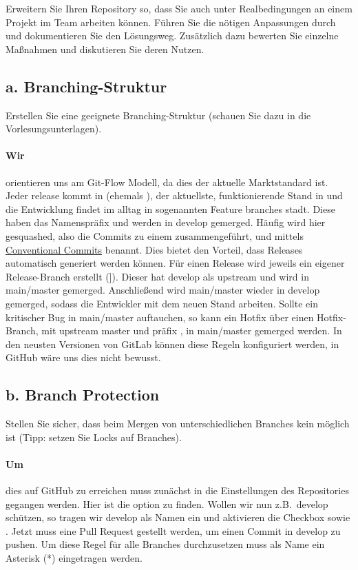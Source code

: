 Erweitern Sie Ihren Repository so, dass Sie auch unter Realbedingungen an einem Projekt im Team arbeiten können.
Führen Sie die nötigen Anpassungen durch und dokumentieren Sie den Lösungsweg.
Zusätzlich dazu bewerten Sie einzelne Maßnahmen und diskutieren Sie deren Nutzen.

\subsection{a. Branching-Struktur}\label{subsec:a.-branching-struktur}
Erstellen Sie eine geeignete Branching-Struktur (schauen Sie dazu in die Vorlesungsunterlagen).

\paragraph{Wir} orientieren uns am Git-Flow Modell, da dies der aktuelle Marktstandard ist.
Jeder release kommt in  (ehemals ), der aktuellste, funktionierende Stand in  und die Entwicklung findet im alltag in sogenannten Feature branches stadt.
Diese haben das Namenspräfix  und werden in develop gemerged.
Häufig wird hier gesquashed, also die Commits zu einem zusammengeführt, und mittels \href{https://www.conventionalcommits.org/en/v1.0.0/}{Conventional Commits} benannt.
Dies bietet den Vorteil, dass Releases automatisch generiert werden können.
Für einen Release wird jeweils ein eigener Release-Branch erstellt (]).
Dieser hat develop als upstream und wird in main/master gemerged.
Anschließend wird main/master wieder in develop gemerged, sodass die Entwickler mit dem neuen Stand arbeiten.
Sollte ein kritischer Bug in main/master auftauchen, so kann ein Hotfix über einen Hotfix-Branch, mit upstream master und präfix , in main/master gemerged werden.
In den neusten Versionen von GitLab können diese Regeln konfiguriert werden, in GitHub wäre uns dies nicht bewusst.

\subsection{b. Branch Protection}\label{subsec:b.-branch-protection}
Stellen Sie sicher, dass beim Mergen von unterschiedlichen Branches kein  möglich ist (Tipp: setzen Sie Locks auf Branches).

\paragraph{Um} dies auf GitHub zu erreichen muss zunächst in die Einstellungen des Repositories gegangen werden.
Hier ist die option  zu finden.
Wollen wir nun z.B.\ develop schützen, so tragen wir develop als Namen ein und aktivieren die Checkbox  sowie .
Jetzt muss eine Pull Request gestellt werden, um einen Commit in develop zu pushen.
Um diese Regel für alle Branches durchzusetzen muss als Name ein Asterisk (*) eingetragen werden.

